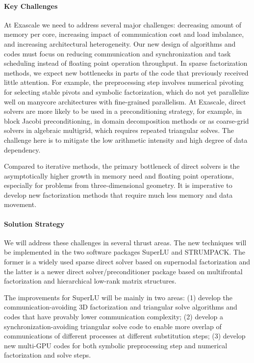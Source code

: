 \vspace{-10pt}
\paragraph{Key Challenges}
At Exascale we need to address several major challenges:
decreasing amount of memory per core, increasing impact of communication
cost and load imbalance, and increasing architectural heterogeneity.
Our new design of algorithms and codes must focus on
reducing communication and synchronization and task scheduling 
instead of floating point operation throughput. In sparse factorization
methods, we expect new bottlenecks in parts of the code
that previously received little attention. For example, the preprocessing
step involves numerical pivoting for selecting stable pivots and
symbolic factorization, which do not yet parallelize well on manycore
architectures with fine-grained parallelism.
At Exascale, direct solvers are more likely to
be used in a preconditioning strategy, for example, in block Jacobi
preconditioning, in domain decomposition methods or as coarse-grid
solvers in algebraic multigrid, which requires repeated triangular
solves. The challenge here is to mitigate the low arithmetic intensity
and high degree of data dependency.

Compared to iterative methods, the primary bottleneck of direct solvers
is the asymptotically higher growth in memory need and floating point
operations, especially for problems from three-dimensional geometry.
It is imperative to develop new factorization methods that require
much less memory and data movement.

\vspace{-10pt}
\paragraph{Solution Strategy}
We will address these challenges in several thrust areas.
The new techniques will be implemented in the two software packages SuperLU
and STRUMPACK. The former is a widely used sparse direct solver based on
supernodal factorization and the latter is a newer direct
solver/preconditioner package based on multifrontal factorization 
and hierarchical low-rank matrix structures.

The improvements for SuperLU will be mainly in two areas: (1) develop
the communication-avoiding 3D factorization and triangular solve
algorithms and codes that have provably lower communication complexity;
(2) develop a synchronization-avoiding triangular solve code to enable more
overlap of communications of different processes at different substitution steps;
(3) develop new multi-GPU codes for both symbolic preprocessing step and
numerical factorization and solve steps.


